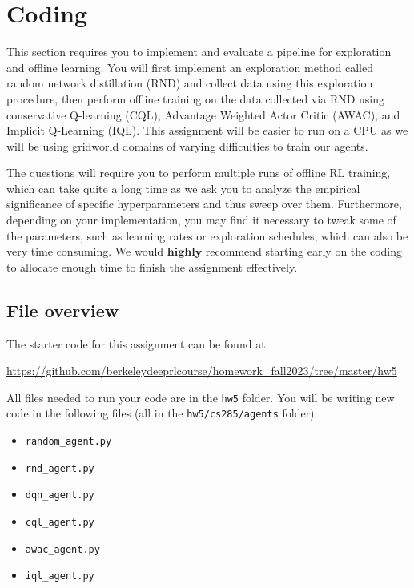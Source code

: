 \documentclass{article}
\begin{document}
\section{Coding}
\label{sec:coding}
This section requires you to implement and evaluate a pipeline for exploration and offline learning. You will first implement an exploration method called random network distillation (RND) and collect data using this exploration procedure, then perform offline training on the data collected via RND using conservative Q-learning (CQL), Advantage Weighted Actor Critic (AWAC), and Implicit Q-Learning (IQL). 
This assignment will be easier to run on a CPU as we will be using gridworld domains of varying difficulties to train our agents. 

The questions will require you to perform multiple runs of offline RL training, which can take quite a long time as we ask you to analyze the empirical significance of specific hyperparameters and thus sweep over them. Furthermore, depending on your implementation, you may find it necessary to tweak some of the parameters, such as learning rates or exploration schedules, which can also be very time consuming. We would $\textbf{highly}$ recommend starting early on the coding to allocate enough time to finish the assignment effectively.

\subsection{File overview}
The starter code for this assignment can be found at

\begin{centering}
\url{https://github.com/berkeleydeeprlcourse/homework_fall2023/tree/master/hw5} \\
\end{centering}
\vspace{.35cm}

All files needed to run your code are in the \texttt{hw5} folder. 
You will be writing new code in the following files (all in the \texttt{hw5/cs285/agents} folder):
\begin{itemize}
\item \texttt{random\_agent.py}
\item \texttt{rnd\_agent.py}
\item \texttt{dqn\_agent.py}
\item \texttt{cql\_agent.py}
\item \texttt{awac\_agent.py}
\item \texttt{iql\_agent.py}
\end{itemize}
\end{document}
